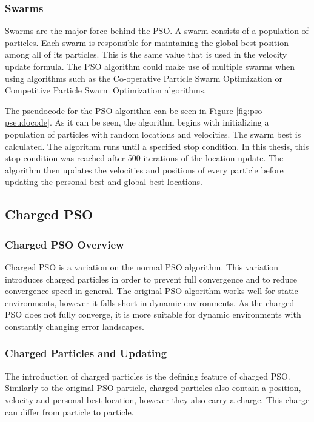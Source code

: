 \subsubsection{Swarms}
Swarms are the major force behind the PSO. A swarm consists of a population of particles. Each swarm is responsible for maintaining the global best position among all of its particles. This is the same value that is used in the velocity update formula. The PSO algorithm could make use of multiple swarms when using algorithms such as the Co-operative Particle Swarm Optimization or Competitive Particle Swarm Optimization algorithms.

The pseudocode for the PSO algorithm can be seen in Figure \ref{fig:pso-pseudocode}. As it can be seen, the algorithm begins with initializing a population of particles with random locations and velocities. The swarm best is calculated. The algorithm runs until a specified stop condition. In this thesis, this stop condition was reached after 500 iterations of the location update. The algorithm then updates the velocities and positions of every particle before updating the personal best and global best locations.

\subsection{Charged PSO}
\subsubsection{Charged PSO Overview}
Charged PSO is a variation on the normal PSO algorithm\cite{charged-pso-slides}. This variation introduces charged particles in order to prevent full convergence and to reduce convergence speed in general. The original PSO algorithm works well for static environments, however it falls short in dynamic environments. As the charged PSO does not fully converge, it is more suitable for dynamic environments with constantly changing error landscapes.

\subsubsection{Charged Particles and Updating}
The introduction of charged particles is the defining feature of charged PSO. Similarly to the original PSO particle, charged particles also contain a position, velocity and personal best location, however they also carry a charge. This charge can differ from particle to particle. 

